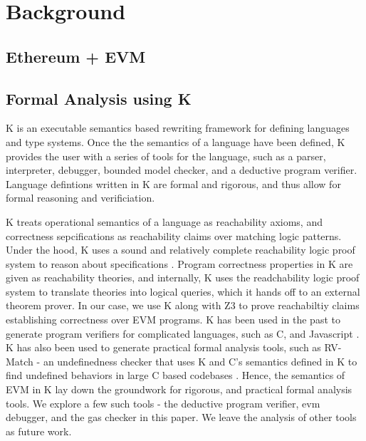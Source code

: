 \section{Background}
\subsection{Ethereum + EVM}
\subsection{Formal Analysis using K}
K is an executable semantics based rewriting framework for defining languages and type systems. Once the the semantics of a language have been defined, K provides the user with a series of tools for the language, such as a parser, interpreter, debugger, bounded model checker, and a deductive program verifier. Language defintions written in K are formal and rigorous, and thus allow for formal reasoning and verificiation.  

K treats operational semantics of a language as reachability axioms, and correctness sepcifications as reachability claims over matching logic patterns. Under the hood, K uses a sound and relatively complete reachability logic proof system to reason about specifications \cite{stefanescu-park-yuwen-li-rosu-2016-oopsla} \cite{stefanescu-ciobaca-mereuta-moore-serbanuta-rosu-2014-rta}. Program correctness properties in K are given as reachability theories, and internally, K uses the readchability logic proof system to translate theories into logical queries, which it hands off to an external theorem prover. In our case, we use K along with Z3 \cite{de2008z3} to prove reachabiltiy claims establishing correctness over EVM programs. K has been used in the past to generate program verifiers for complicated languages, such as C, and Javascript \cite{stefanescu-park-yuwen-li-rosu-2016-oopsla}. K has also been used to generate practical formal analysis tools, such as RV-Match - an undefinedness checker that uses K and C's semantics defined in K to find undefined behaviors in large C based codebases \cite{guth-hathhorn-saxena-rosu-2016-cav}. Hence, the semantics of EVM in K lay down the groundwork for rigorous, and practical formal analysis tools. We explore a few such tools - the deductive program verifier, evm debugger, and the gas checker in this paper. We leave the analysis of other tools as future work.
